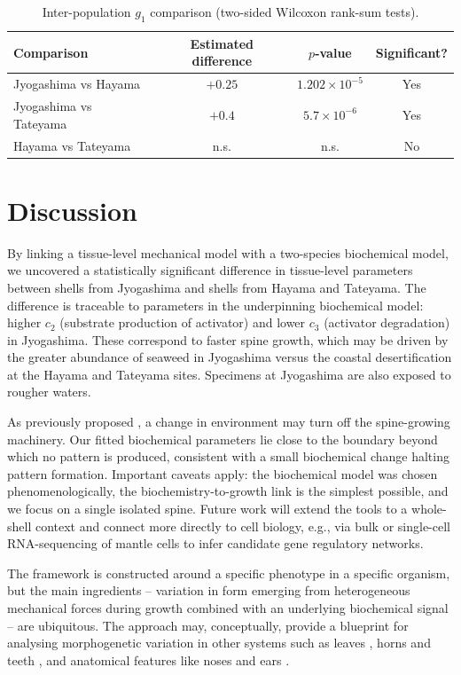\documentclass[11pt]{article}
\begin{document}
\begin{table}[htbp]
\centering
\caption{Inter-population $g_1$ comparison (two-sided Wilcoxon rank-sum tests).}
\begin{tabular}{lccc}
\toprule
Comparison & Estimated difference & $p$-value & Significant? \\
\midrule
Jyogashima vs Hayama   & $+0.25$ & $1.202 \times 10^{-5}$ & Yes \\
Jyogashima vs Tateyama & $+0.4$  & $5.7 \times 10^{-6}$   & Yes \\
Hayama vs Tateyama     & n.s.    & n.s.                   & No  \\
\bottomrule
\end{tabular}
\end{table}

\section{Discussion}
By linking a tissue-level mechanical model with a two-species biochemical model, we uncovered a statistically significant difference in tissue-level parameters between shells from Jyogashima and shells from Hayama and Tateyama. The difference is traceable to parameters in the underpinning biochemical model: higher $c_2$ (substrate production of activator) and lower $c_3$ (activator degradation) in Jyogashima. These correspond to faster spine growth, which may be driven by the greater abundance of seaweed in Jyogashima versus the coastal desertification \citep{ref33,ref34} at the Hayama and Tateyama sites. Specimens at Jyogashima are also exposed to rougher waters.

As previously proposed \citep{ref30}, a change in environment may turn off the spine-growing machinery. Our fitted biochemical parameters lie close to the boundary beyond which no pattern is produced, consistent with a small biochemical change halting pattern formation. Important caveats apply: the biochemical model was chosen phenomenologically, the biochemistry-to-growth link is the simplest possible, and we focus on a single isolated spine. Future work will extend the tools to a whole-shell context and connect more directly to cell biology, e.g., via bulk or single-cell RNA-sequencing of mantle cells \citep{ref42,ref43} to infer candidate gene regulatory networks.

The framework is constructed around a specific phenotype in a specific organism, but the main ingredients -- variation in form emerging from heterogeneous mechanical forces during growth combined with an underlying biochemical signal -- are ubiquitous. The approach may, conceptually, provide a blueprint for analysing morphogenetic variation in other systems such as leaves \citep{ref44}, horns and teeth \citep{ref45,ref46}, and anatomical features like noses and ears \citep{ref47,ref48}.



\end{document}
